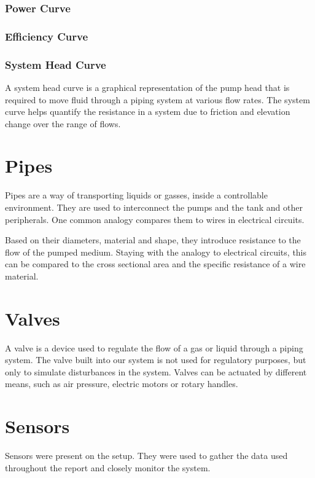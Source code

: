 \subsubsection{Power Curve}
\subsubsection{Efficiency Curve}


\subsubsection{System Head Curve}
A system head curve is a graphical representation of the pump head that is required 
to move fluid through a piping system at various flow rates.
The system curve helps quantify the resistance in a system due to friction and 
elevation change over the range of flows.





\section{Pipes}
Pipes are a way of transporting liquids or gasses, inside a controllable environment.
They are used to interconnect the pumps and the tank and other peripherals.
One common analogy compares them to wires in electrical circuits.

Based on their diameters, material and shape,
they introduce resistance to the flow of the pumped medium.
Staying with the analogy to electrical circuits,
this can be compared to the cross sectional area and the specific resistance of a wire material.

\section{Valves}
A valve is a device used to regulate the flow of a gas or liquid through a piping system.
The valve built into our system is not used for regulatory purposes,
but only to simulate disturbances in the system.
Valves can be actuated by different means, such as air pressure, electric motors or rotary handles.

\section{Sensors}
Sensors were present on the setup. They were used to gather the data used throughout the report 
and closely monitor the system.

